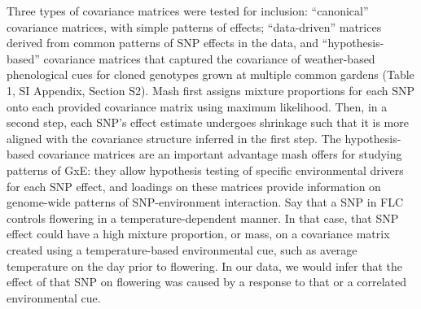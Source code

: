 \documentclass[
  9pt,
  twocolumn,
  twoside]{pnas-new}
\begin{document}
Three types of covariance matrices were tested for inclusion:
``canonical'' covariance matrices, with simple patterns of effects;
``data-driven'' matrices derived from common patterns of SNP effects in
the data, and ``hypothesis-based'' covariance matrices that captured the
covariance of weather-based phenological cues for cloned genotypes grown
at multiple common gardens (Table 1, SI Appendix, Section S2). Mash
first assigns mixture proportions for each SNP onto each provided
covariance matrix using maximum likelihood. Then, in a second step, each
SNP's effect estimate undergoes shrinkage such that it is more aligned
with the covariance structure inferred in the first step. The
hypothesis-based covariance matrices are an important advantage mash
offers for studying patterns of GxE: they allow hypothesis testing of
specific environmental drivers for each SNP effect, and loadings on
these matrices provide information on genome-wide patterns of
SNP-environment interaction. Say that a SNP in FLC controls flowering in
a temperature-dependent manner. In that case, that SNP effect could have
a high mixture proportion, or mass, on a covariance matrix created using
a temperature-based environmental cue, such as average temperature on
the day prior to flowering. In our data, we would infer that the effect
of that SNP on flowering was caused by a response to that or a
correlated environmental cue.
\end{document}
